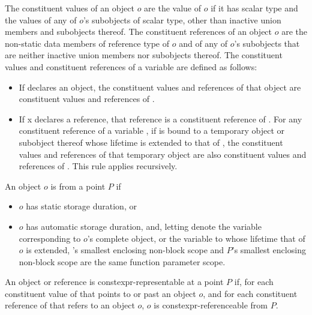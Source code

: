 \documentclass{wg21}
\begin{document}
\begin{addedblock}
The constituent values of an object $o$ are the value of $o$ if it has scalar type and the values of
any of $o$’s subobjects of scalar type, other than inactive union members and subobjects
thereof. The constituent references of an object $o$ are the non-static data members of
reference type of $o$ and of any of $o$’s subobjects that are neither inactive union members nor
subobjects thereof.
The constituent values and constituent references of a variable  are defined as follows:
\begin{itemize}
\item If  declares an object, the constituent values and references of that object are
constituent values and references of .
\item If x declares a reference, that reference is a constituent reference of .
For any constituent reference  of a variable , if  is bound to a temporary object or
subobject thereof whose lifetime is extended to that of , the constituent values and
references of that temporary object are also constituent values and references of . This rule
applies recursively.
\end{itemize}

An object $o$ is  from a point $P$ if
\begin{itemize}
\item $o$ has static storage duration, or
\item $o$ has automatic storage duration, and, letting  denote the variable corresponding to
$o$’s complete object, or the variable to whose lifetime that of $o$ is extended, ’s smallest
enclosing non-block scope and $P$’s smallest enclosing non-block scope are the same function parameter scope.
\end{itemize}

An object or reference  is constexpr-representable at a point $P$ if, for each constituent value
of  that points to or past an object $o$, and for each constituent reference of  that refers to an
object $o$, $o$ is constexpr-referenceable from $P$.

\end{addedblock}
\end{document}
